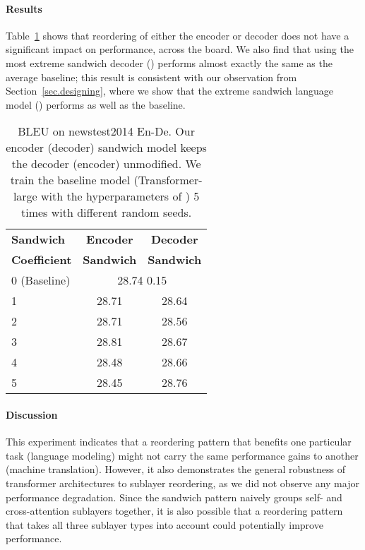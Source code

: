 \documentclass[11pt,a4paper]{article}
\begin{document}
\paragraph{Results}
Table~\ref{tab.allnmt} shows that reordering of either the encoder or decoder does not have a significant impact on performance, across the board.
We also find that using the most extreme sandwich decoder ({\Large \texttt{}}{\Large \texttt{}}){\Large \texttt{}} performs almost exactly the same as the average baseline; this result is consistent with our observation from Section~\ref{sec.designing}, where we show that the extreme sandwich language model ({\Large \texttt{}}{\Large \texttt{}}) performs as well as the baseline.


\begin{table}[!t]
\centering
\small


\begin{tabular}{lcc}
\toprule
\textbf{Sandwich} & \textbf{Encoder} &  \textbf{Decoder} \\
\textbf{Coefficient} & \textbf{Sandwich} &  \textbf{Sandwich } \\
\midrule
0 (Baseline)                                                                  & \multicolumn{2}{c}{28.74  0.15}  \\ 
\midrule
1                                                                  &  28.71       & 28.64     \\ 
2                                                                  &  28.71       & 28.56     \\ 
3                                                                  &  28.81       & 28.67     \\ 
4                                                                  &  28.48       & 28.66     \\ 
5                                                                  &  28.45       & 28.76     \\ \bottomrule
\end{tabular}

\caption{BLEU on newstest2014 En-De. Our encoder (decoder) sandwich model keeps the decoder (encoder) unmodified. We train the baseline model (Transformer-large with the hyperparameters of \citealp{scalingnmt}) 5 times with different random seeds.}
\label{tab.allnmt}
\end{table}


\paragraph{Discussion}
This experiment indicates that a reordering pattern that benefits one particular task (language modeling) might not carry the same performance gains to another (machine translation).
However, it also demonstrates the general robustness of transformer architectures to sublayer reordering, as we did not observe any major performance degradation. 
Since the sandwich pattern naively groups self- and cross-attention sublayers together, it is also possible that a reordering pattern that takes all three sublayer types into account could potentially improve performance.
\end{document}
